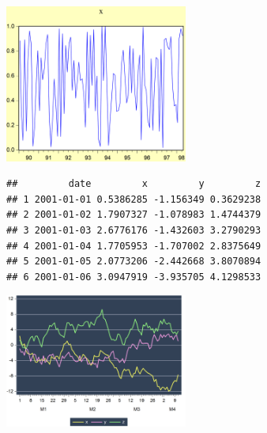 \documentclass[
]{article}
\begin{document}
\begin{center}\includegraphics[width=0.45\textwidth]{test_engEviews_files/figure-latex//eview-graph-x} \end{center}

\begin{verbatim}
##         date         x         y         z
## 1 2001-01-01 0.5386285 -1.156349 0.3629238
## 2 2001-01-02 1.7907327 -1.078983 1.4744379
## 3 2001-01-03 2.6776176 -1.432603 3.2790293
## 4 2001-01-04 1.7705953 -1.707002 2.8375649
## 5 2001-01-05 2.0773206 -2.442668 3.8070894
## 6 2001-01-06 3.0947919 -3.935705 4.1298533
\end{verbatim}

\begin{center}\includegraphics[width=0.45\textwidth]{test_engEviews_files/figure-latex//rwalk-xyz} \end{center}
\end{document}
